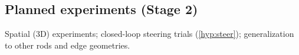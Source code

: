 \begin{outline}
  \item {}
  \item {}
\end{outline}

\subsection{Planned experiments (Stage 2)}
\label{sec:exp:planned}
\begin{outline}
  \item Spatial (3D) experiments; closed-loop steering trials
    (\ref{hyp:steer}); generalization to other rods and edge geometries.
\end{outline}
